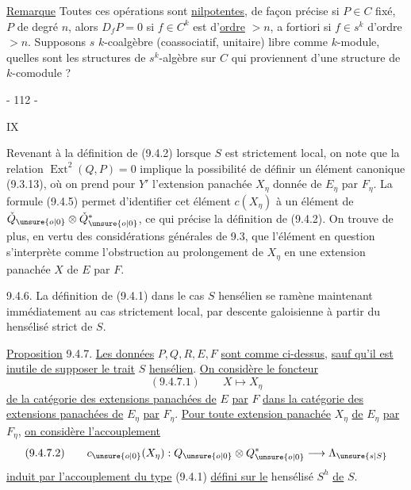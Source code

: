 \uline{Remarque} Toutes ces opérations sont \uline{nilpotentes}, de façon précise si $P\in C$ fixé, $P$ de degré $n$,
alors $D_fP=0$ si $f\in C^k$ est d'\uline{ordre} $>n$,
a fortiori si $f\in s^k$ d'ordre $>n$.
Supposons $s$ $k$-coalgèbre (coassociatif, unitaire)
libre comme $k$-module, quelles sont les structures de $s^k$-algèbre sur  $C$ qui
proviennent d'une structure de $k$-comodule ?
\begin{center}- 112 -\end{center}\hfill IX

Revenant à la définition de (9.4.2) lorsque $S$ est strictement local, on note que la relation $\operatorname{Ext}^2(Q,P)=0$ implique la possibilité de définir un élément canonique (9.3.13), où on prend pour $Y'$ l'extension panachée $X_\eta$ donnée de $E_\eta$ par $F_\eta$. La formule (9.4.5) permet d'identifier cet élément $c(X_\eta)$ à un élément de $\check Q_{\unsure{o|0}}\otimes\check Q_{\unsure{o|0}}^*$, ce qui précise la définition de (9.4.2). On trouve de plus, en vertu des considérations générales de 9.3, que l'élément en question s'interprète comme l'obstruction au prolongement de $X_\eta$ en une extension panachée $X$ de $E$ par $F$.

9.4.6. La définition de (9.4.1) dans le cas $S$ hensélien se ramène maintenant immédiatement au cas strictement local, par descente galoisienne à partir du hensélisé strict de $S$.

\uline{Proposition} 9.4.7. \uline{Les données} $P,Q,R,E,F$ \uline{sont comme ci-dessus}, \uline{sauf qu'il est inutile de supposer le trait} $S$ \uline{hensélien}. \uline{On considère le foncteur}
\[
 (9.4.7.1)\qquad X\longmapsto X_\eta
\]
\uline{de la catégorie des extensions panachées de} $E$ \uline{par} $F$ \uline{dans la catégorie des extensions panachées de} $E_\eta$ \uline{par} $F_\eta$. \uline{Pour toute extension panachée} $X_\eta$ \uline{de} $E_\eta$ \uline{par} $F_\eta$, \uline{on considère l'accouplement}
\[
 (9.4.7.2)\qquad c_{\unsure{o|0}}(X_\eta):Q_{\unsure{o|0}}\otimes Q_{\unsure{o|0}}^*\longrightarrow\Lambda_{\unsure{s|S}}
\]
\uline{induit par l'accouplement du type} (9.4.1) \uline{défini sur le} hensélisé $S^h$ \uline{de} $S$.

